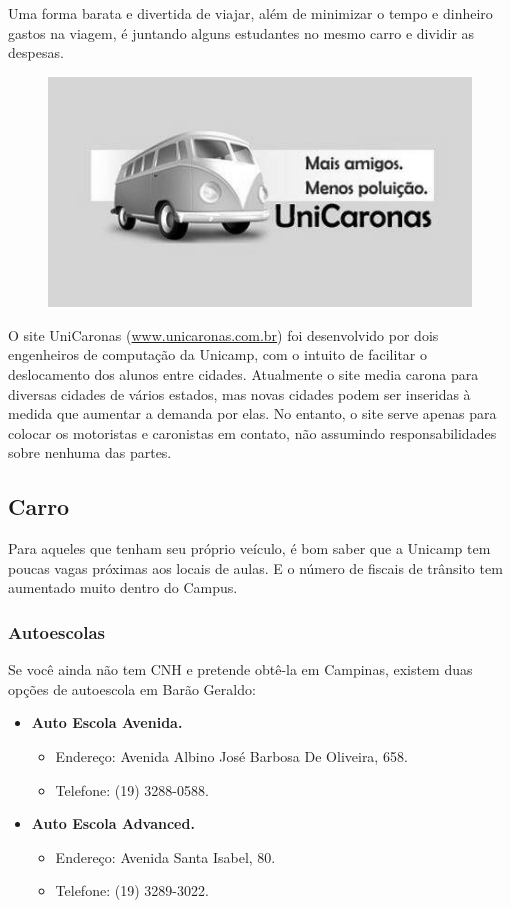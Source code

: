 Uma forma barata e divertida de viajar, além de minimizar o tempo e dinheiro
gastos na viagem, é juntando alguns estudantes no mesmo carro e dividir as
despesas.
\begin{figure}[h!]
    \centering
    \includegraphics[scale=0.55,keepaspectratio=true]{img/imgs/8-transporte/unicaronas.jpg}
\end{figure}


O site UniCaronas (\url{www.unicaronas.com.br}) foi desenvolvido por dois
engenheiros de computação da Unicamp, com o intuito de facilitar o deslocamento
dos alunos entre cidades. Atualmente o site media carona para diversas cidades
de vários estados, mas novas cidades podem ser inseridas à medida que aumentar
a demanda por elas. No entanto, o site serve apenas para colocar os motoristas
e caronistas em contato, não assumindo responsabilidades sobre nenhuma das
partes.

\subsection{Carro}

Para aqueles que tenham seu próprio veículo, é bom saber que a Unicamp tem
poucas vagas próximas aos locais de aulas. E o número de fiscais de trânsito tem
aumentado muito dentro do Campus.

\subsubsection{Autoescolas}

Se você ainda não tem CNH e pretende obtê-la em Campinas, existem duas opções de
autoescola em Barão Geraldo:

\begin{itemize}
\item  \textbf{Auto Escola Avenida.}
    \begin{itemize}
        \item  Endereço: Avenida Albino José Barbosa De Oliveira, 658.
        \item  Telefone: (19) 3288-0588.
    \end{itemize}

\item  \textbf{Auto Escola Advanced.}
    \begin{itemize}
        \item  Endereço: Avenida Santa Isabel, 80.
        \item  Telefone: (19) 3289-3022.
    \end{itemize}
\end{itemize}

